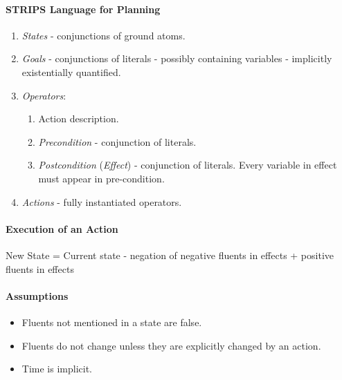 \documentclass[twocolumn,english]{article}
\begin{document}
\paragraph{STRIPS Language for Planning}
\begin{enumerate}
\item \emph{States} - conjunctions of ground atoms.
\item \emph{Goals} - conjunctions of literals - possibly containing variables
- implicitly existentially quantified.
\item \emph{Operators}:
\begin{enumerate}
\item Action description.
\item \emph{Precondition} - conjunction of literals.
\item \emph{Postcondition} (\emph{Effect}) - conjunction of literals. Every
variable in effect must appear in pre-condition.
\end{enumerate}
\item \emph{Actions} - fully instantiated operators.
\end{enumerate}

\paragraph{Execution of an Action}

New State = Current state - negation of negative fluents in effects
+ positive fluents in effects

\paragraph{Assumptions}
\begin{itemize}
\item Fluents not mentioned in a state are false.
\item Fluents do not change unless they are explicitly changed by an action.
\item Time is implicit.
\end{itemize}
\end{document}
